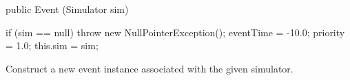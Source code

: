 \begin{comment}
\begin{vcode}

   public Event (double delay) \begin{hide} {
      this (Simulator.getDefaultSimulator(), delay);
   } \end{hide}

   public Event (Simulator sim, double delay)\begin{hide} {
      if (sim == null)
         throw new NullPointerException();
      if (delay >= 0.0) {
         priority = 1;
         this.sim = sim;
         eventTime = sim.time() + delay;
         sim.eventList.add (this);
      }
      else
         throw new IllegalArgumentException ("Cannot schedule in the past.");
   }\end{hide}
\end{vcode}
   \begin{tabb} Constructs a new event and inserts it in the event
     list of the default simulator.
    If \texttt{delay >= 0.0}, the event is scheduled to happen in
    \texttt{delay} units of simutated time.
    If two or more events are scheduled to happen at the same time,
    events with the highest priorities (lowest value of the
    \texttt{priority}
    field) occur first.  If two or more events are schedule to the
    same time, with the same priority,
    they are placed in the event list (and executed) in the same order
    as they have been scheduled.

   We recall that such constructors with parameters are not inherited
   automatically by the subclasses in Java, but they can be invoked
   using \texttt{super}. For example, one can have
\begin{vcode}
   class Bang extends Event {
      public Bang (double delay) { super (delay); }
      public void actions() {  \dots  }
\end{vcode}
   and then invoke the constructor ``\texttt{new Bang (10.0)}'' to get
   a \texttt{Bang} in 10 units of time.
   This is equivalent to ``\texttt{new Bang().schedule(10.0)}.''
  \end{tabb}
\begin{htmlonly}
   \param{delay}{simulation time that must pass before the event happens}
\end{htmlonly}
\end{comment}
\begin{code}

   public Event (Simulator sim) \begin{hide} {
      if (sim == null)
         throw new NullPointerException();
      eventTime = -10.0;
      priority = 1.0;
      this.sim = sim;
   } \end{hide}
\end{code}
  \begin{tabb} Construct a new event instance associated with the given simulator.
  \end{tabb}
\begin{htmlonly}
\end{htmlonly}


